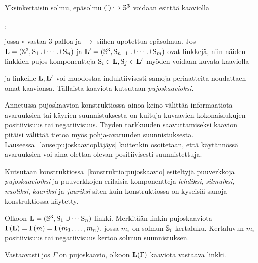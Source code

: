 \begin{konstruktio}
    Yksinkertaisin solmu, epäsolmu $\bigcirc\hookrightarrow\S^3$ voidaan esittää kaaviolla
    \begin{center}
        ,
    \end{center}
    jossa $\circ$ vastaa 3-palloa ja $\rightarrow$ siihen upotettua epäsolmua. Jos $\linkki=(\S^3,\solmu_1\cup\cdots\cup\solmu_n)$ ja $\linkki'=(\S^3,\solmu_{n+1}\cup\cdots\cup\solmu_m)$ ovat linkkejä, niin näiden linkkien pujos komponentteja $\solmu_i\in\linkki,\solmu_j\in\linkki'$ myöden voidaan kuvata kaaviolla
    \begin{center}
    \end{center}
    ja linkeille $\linkki,\linkki'$ voi muodostaa induktiivisesti samoja periaatteita noudattaen omat kaavionsa. Tällaista kaaviota kutsutaan \emph{pujoskaavioksi.}
\end{konstruktio}
\begin{huomautus}
    Annetussa pujoskaavion konstruktiossa ainoa keino välittää informaatiota avaruuksien tai käyrien suunnistuksesta on kuituja kuvaavien kokonaislukujen positiivisuus tai negatiivisuus. Täyden tarkkuuden saavuttamiseksi kaavion pitäisi välittää tietoa myös pohja-avaruuden suunnistuksesta. Lauseessa~\ref{lause:pujoskaaviopläjäys} kuitenkin osoitetaan, että käytännössä avaruuksien voi aina olettaa olevan positiivisesti suunnistettuja.
\end{huomautus}
\begin{maaritelma}[Pujoskaavio]
    Kutsutaan konstruktiossa~\ref{konstruktio:pujoskaavio} esiteltyjä puuverkkoja \emph{pujoskaavioiksi} ja puuverkkojen erilaisia komponentteja \emph{lehdiksi}, \emph{silmuiksi}, \emph{nuoliksi}, \emph{kaariksi} ja \emph{juuriksi} siten kuin konstruktiossa on kyseisiä sanoja konstruktiossa käytetty.

    Olkoon $\linkki=(\S^3,\solmu_1\cup\cdots\solmu_n)$ linkki. Merkitään linkin pujoskaaviota $\Gamma(\linkki)=\Gamma(m)=\Gamma(m_1,\dots,m_n)$, jossa $m_i$ on solmun $\S_i$ kertaluku. Kertaluvun $m_i$ positiivisuus tai negatiivisuus kertoo solmun suunnistuksen.

    Vastaavasti jos $\Gamma$ on pujoskaavio, olkoon $\linkki(\Gamma)$ kaaviota vastaava linkki.
\end{maaritelma}
